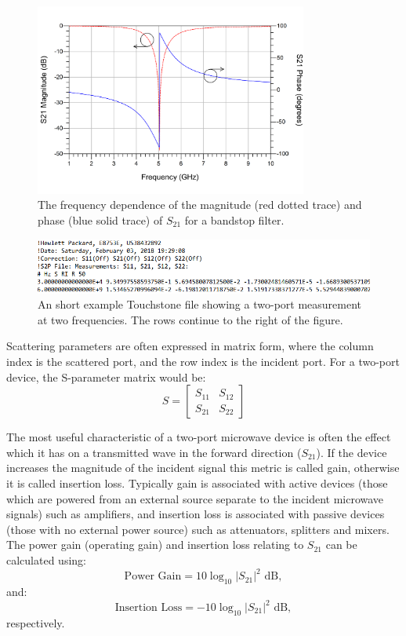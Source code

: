 \documentclass[../thesis/thesis.tex]{subfiles}
\begin{document}
\begin{refsection}
\begin{figure}
	\centering
	\includegraphics[width=0.8\textwidth]{ch2_filter}
	\caption{The frequency dependence of the magnitude (red dotted trace) and phase (blue solid trace) of $S_{21}$ for a bandstop filter.}
	\label{ch2_fig_filter}
\end{figure}

\begin{figure}
	\centering
	\includegraphics[width=\textwidth]{ch2_s2p}
	\caption{An short example Touchstone file showing a two-port measurement at two frequencies. The rows continue to the right of the figure.}
	\label{ch2_fig_s2p}
\end{figure}

Scattering parameters are often expressed in matrix form, where the column index is the scattered port, and the row index is the incident port. For a two-port device, the S-parameter matrix would be:
\begin{equation}
S=
\begin{bmatrix}
S_{11} & S_{12} \\
S_{21} & S_{22}
\end{bmatrix}
\end{equation}

The most useful characteristic of a two-port microwave device is often the effect which it has on a transmitted wave in the forward direction ($S_{21}$). If the device increases the magnitude of the incident signal this metric is called gain, otherwise it is called insertion loss. Typically gain is associated with active devices (those which are powered from an external source separate to the incident microwave signals) such as amplifiers, and insertion loss is associated with passive devices (those with no external power source) such as attenuators, splitters and mixers. The power gain (operating gain) and insertion loss relating to $S_{21}$ can be calculated using:
\begin{equation}
\textrm{Power Gain} = 10 \log_{10} |S_{21}|^2 \textrm{ dB},
\end{equation}
and:
\begin{equation}
\textrm{Insertion Loss} = -10 \log_{10} |S_{21}|^2 \textrm{ dB},
\end{equation}
respectively.


\end{refsection}
\end{document}
